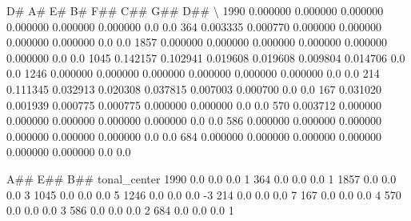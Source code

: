 \documentclass[letterpaper,10pt,english]{sphinxmanual}
\begin{document}
{\begin{sphinxVerbatim}[commandchars=\\\{\}]
            D\#        A\#        E\#        B\#       F\#\#       C\#\#  G\#\#  D\#\#  \textbackslash{}
1990  0.000000  0.000000  0.000000  0.000000  0.000000  0.000000  0.0  0.0
364   0.003335  0.000770  0.000000  0.000000  0.000000  0.000000  0.0  0.0
1857  0.000000  0.000000  0.000000  0.000000  0.000000  0.000000  0.0  0.0
1045  0.142157  0.102941  0.019608  0.019608  0.009804  0.014706  0.0  0.0
1246  0.000000  0.000000  0.000000  0.000000  0.000000  0.000000  0.0  0.0
214   0.111345  0.032913  0.020308  0.037815  0.007003  0.000700  0.0  0.0
167   0.031020  0.001939  0.000775  0.000775  0.000000  0.000000  0.0  0.0
570   0.003712  0.000000  0.000000  0.000000  0.000000  0.000000  0.0  0.0
586   0.000000  0.000000  0.000000  0.000000  0.000000  0.000000  0.0  0.0
684   0.000000  0.000000  0.000000  0.000000  0.000000  0.000000  0.0  0.0

      A\#\#  E\#\#  B\#\#  tonal\_center
1990  0.0  0.0  0.0             1
364   0.0  0.0  0.0             1
1857  0.0  0.0  0.0             3
1045  0.0  0.0  0.0             5
1246  0.0  0.0  0.0            -3
214   0.0  0.0  0.0             7
167   0.0  0.0  0.0             4
570   0.0  0.0  0.0             3
586   0.0  0.0  0.0             2
684   0.0  0.0  0.0             1
\end{sphinxVerbatim}
}

{
\begin{sphinxVerbatim}[commandchars=\\\{\}]
\llap{\color{nbsphinxin}[23]:\,\hspace{\fboxrule}\hspace{\fboxsep}}   
   

   

  \PYG{p}{[}     \PYG{p}{[}\PYG{p}{]}\PYG{p}{]}
\end{sphinxVerbatim}
}
\end{document}
